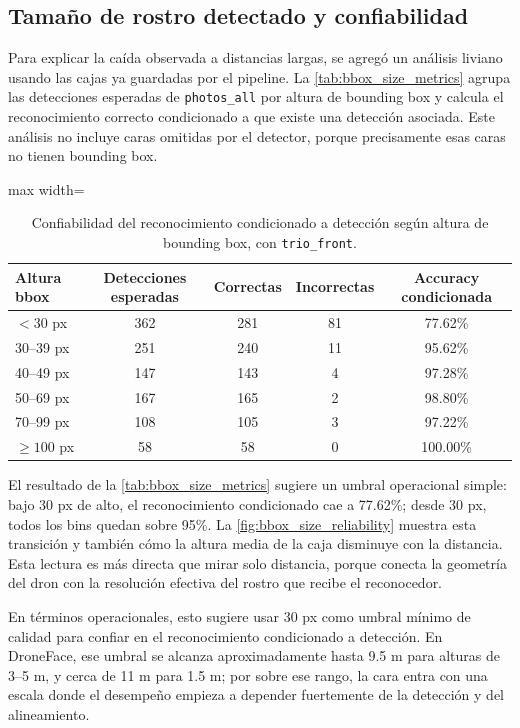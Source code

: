 \documentclass[11pt]{article}
\begin{document}
\subsection{Tama\~no de rostro detectado y confiabilidad}
\label{sec:bbox_size}

Para explicar la ca\'ida observada a distancias largas, se agreg\'o un an\'alisis liviano usando las cajas ya guardadas por el pipeline. La \autoref{tab:bbox_size_metrics} agrupa las detecciones esperadas de \texttt{photos\_all} por altura de bounding box y calcula el reconocimiento correcto condicionado a que existe una detecci\'on asociada. Este an\'alisis no incluye caras omitidas por el detector, porque precisamente esas caras no tienen bounding box.

\begin{table}[H]
\centering
\caption{Confiabilidad del reconocimiento condicionado a detecci\'on seg\'un altura de bounding box, con \texttt{trio\_front}.}
\label{tab:bbox_size_metrics}
\begin{adjustbox}{max width=\textwidth}
\begin{tabular}{lcccc}
\toprule
Altura bbox & Detecciones esperadas & Correctas & Incorrectas & Accuracy condicionada \\
\midrule
$<30$ px & 362 & 281 & 81 & 77.62\% \\
30--39 px & 251 & 240 & 11 & 95.62\% \\
40--49 px & 147 & 143 & 4 & 97.28\% \\
50--69 px & 167 & 165 & 2 & 98.80\% \\
70--99 px & 108 & 105 & 3 & 97.22\% \\
$\geq100$ px & 58 & 58 & 0 & 100.00\% \\
\bottomrule
\end{tabular}
\end{adjustbox}
\end{table}

El resultado de la \autoref{tab:bbox_size_metrics} sugiere un umbral operacional simple: bajo 30 px de alto, el reconocimiento condicionado cae a 77.62\%; desde 30 px, todos los bins quedan sobre 95\%. La \autoref{fig:bbox_size_reliability} muestra esta transici\'on y tambi\'en c\'omo la altura media de la caja disminuye con la distancia. Esta lectura es m\'as directa que mirar solo distancia, porque conecta la geometr\'ia del dron con la resoluci\'on efectiva del rostro que recibe el reconocedor.

En t\'erminos operacionales, esto sugiere usar 30 px como umbral m\'inimo de calidad para confiar en el reconocimiento condicionado a detecci\'on. En DroneFace, ese umbral se alcanza aproximadamente hasta 9.5 m para alturas de 3--5 m, y cerca de 11 m para 1.5 m; por sobre ese rango, la cara entra con una escala donde el desempe\~no empieza a depender fuertemente de la detecci\'on y del alineamiento.
\end{document}
